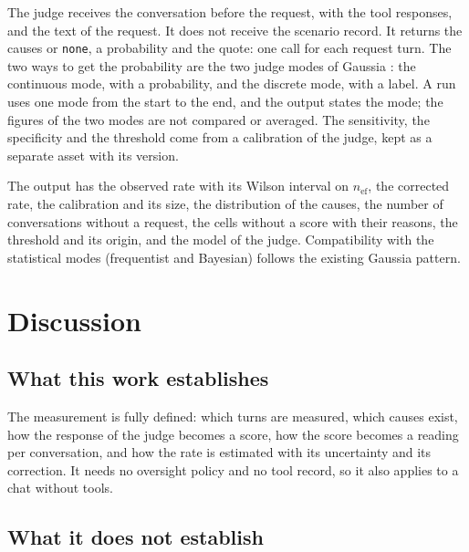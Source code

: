 \documentclass[11pt,a4paper]{article}
\begin{document}
The judge receives the conversation before the request, with the tool responses, and the text of the request. It
does not receive the scenario record. It returns the causes or \texttt{none}, a probability and the quote: one
call for each request turn. The two ways to get the probability are the two judge modes of Gaussia \cite{gaussia2026}: the continuous mode, with a probability, and the
discrete mode, with a label. A run uses one mode from the start to the end, and the output states the mode; the figures of the two modes
are not compared or averaged. The sensitivity, the specificity and the threshold come from a calibration of the
judge, kept as a separate asset with its version.

The output has the observed rate with its Wilson interval on $n_{\mathrm{ef}}$, the corrected rate, the
calibration and its size, the distribution of the causes, the number of conversations without a request, the
cells without a score with their reasons, the threshold and its origin, and the model of the judge. Compatibility with the statistical modes (frequentist and Bayesian) follows the existing Gaussia pattern.

\section{Discussion}

\subsection{What this work establishes}

The measurement is fully defined: which turns are measured, which causes exist, how the response of the judge
becomes a score, how the score becomes a reading per conversation, and how the rate is estimated with its
uncertainty and its correction. It needs no oversight policy and no tool record, so it also applies to a chat
without tools.

\subsection{What it does not establish}
\end{document}
